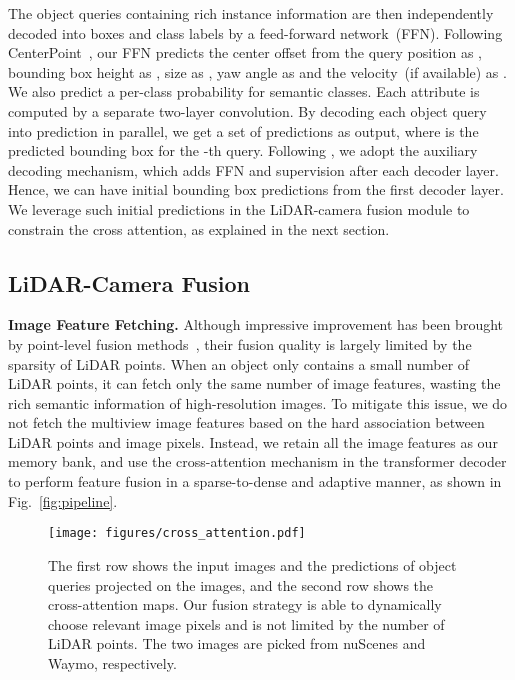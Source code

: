 The  object queries containing rich instance information are then independently decoded into boxes and class labels by a feed-forward network~(FFN). 
Following CenterPoint~\cite{Yin2020Centerbased3O}, our FFN predicts the center offset from the query position as , bounding box height as , size  as , yaw angle  as  and the velocity~(if available) as . We also predict a per-class probability  for  semantic classes. Each attribute is computed by a separate two-layer  convolution. 
 By decoding each object query into prediction in parallel, we get a set of predictions  as output, where  is the predicted bounding box for the -th query. 
Following \cite{misra20213detr}, we adopt the auxiliary decoding mechanism{,} which adds FFN and supervision after each decoder layer{. Hence}, we {can} have initial bounding box predictions from the first decoder layer. We leverage such initial predictions in the LiDAR-camera fusion module to constrain the cross attention, {as} explained in {the} next section. 

















\subsection{LiDAR-Camera Fusion}

\noindent\textbf{Image Feature Fetching.} Although impressive improvement has been brought by point-level fusion methods~\cite{Vora2020PointPaintingSF, Wang2021PointAugmentingCA}, their fusion quality is largely limited by the sparsity of LiDAR points. When an object only contains a small number of LiDAR points, it can fetch {only} the same number of image features, wasting the rich semantic information of high-resolution images. To mitigate this issue, we do not fetch the multiview image features based on the hard association between LiDAR points and image pixels. Instead, we retain all the image features  as our memory bank, and use the cross-attention mechanism in {the} transformer decoder to perform feature fusion 
in a sparse-to-dense and adaptive manner, as shown in Fig.~\ref{fig:pipeline}. 


\begin{figure}[t]
	\vspace{-0.5cm}
	\setlength{\abovecaptionskip}{0.0cm}
	\setlength{\belowcaptionskip}{-0.45cm}
	\center
    \texttt{[image: figures/cross\_attention.pdf]}
    \caption{The first row shows the input images and the predictions of object queries projected on the images, and the second row shows the cross-attention maps. Our fusion strategy is able to dynamically choose relevant image pixels and is not limited by the number of LiDAR {points}. The two images are picked from nuScenes and Waymo, respectively.}
    \label{fig:cross_attention}
\end{figure}

